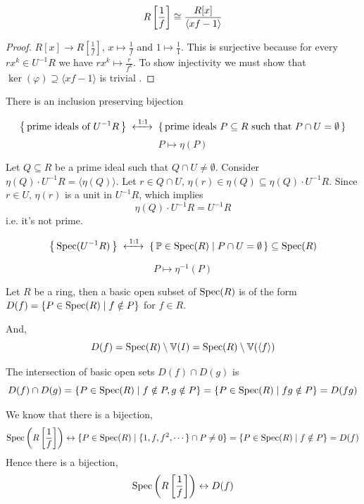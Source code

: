 \documentclass[12pt]{amsart}
\begin{document}
\begin{lemma}
    \[R\left[\frac{1}{f}\right] \cong \frac{R[x]}{\langle xf - 1 \rangle}\]
\end{lemma}
\begin{proof}
    $R[x] \to R\left[\frac{1}{f}\right]$, $x \mapsto \frac{1}{f}$ and $1 \mapsto \frac{1}{1}$. This is surjective because for every $rx^k \in U^{-1}R$ we have $rx^k \mapsto \frac{r}{f^k}$. To show injectivity we must show that $\ker(\varphi) \supseteq \langle xf -1 \rangle$ is trivial \todo{}. 
\end{proof}

\begin{theorem}
    There is an inclusion preserving bijection

    \[
        \left\{\, \text{prime ideals of } U^{-1}R \,\right\}
        \;\xleftrightarrow{\;1:1\;}\;
        \left\{\, \text{prime ideals } P \subseteq R \text{ such that } P \cap U = \emptyset \,\right\}
    \]
    \[P \mapsto \eta(P)\]

    Let $Q \subseteq R$ be a prime ideal such that $Q\cap U \neq \emptyset$. Consider $\eta(Q) \cdot U^{-1}R = \langle \eta(Q) \rangle$. Let $r \in Q \cap U$, $\eta(r) \in \eta(Q) \subseteq \eta(Q) \cdot U^{-1}R$. Since $r \in U$, $\eta(r)$ is a unit in $U^{-1}R$, which implies 
    \[\eta(Q)\cdot U^{-1}R = U^{-1}R\]
    i.e. it's not prime. \todo{}
\end{theorem}

\begin{theorem}
    \[
        \left\{\, \operatorname{Spec} (U^{-1}R) \,\right\}
        \;\xleftrightarrow{\;1:1\;}\;
        \left\{\, \mathbb P \in \operatorname{Spec}(R) \mid P \cap U = \emptyset \,\right\} \subseteq \operatorname{Spec}(R)
    \]

    \[P \mapsto \eta^{-1}(P)\]
\end{theorem}

\begin{definition}
    Let $R$ be a ring, then a basic open subset of $\operatorname{Spec}(R)$ is of the form $D(f) = \{P \in \operatorname{Spec}(R) \mid f \notin P\}$ for $f \in R$.  

    And, 
    \[D(f) = \operatorname{Spec}(R)\setminus\mathbb V(I) = \operatorname{Spec}(R) \setminus \mathbb V(\langle f \rangle)\]

    The intersection of basic open sets $D(f) \cap D(g)$ is 
    \[D(f) \cap D(g) = \{P \in \operatorname{Spec}(R) \mid f \notin P, g \notin P\} =\{P \in \operatorname{Spec}(R) \mid fg \notin P\} = D(fg)  \]
\end{definition}

\begin{remark}
    We know that there is a bijection, 
    \[\operatorname{Spec}\left(R\left[\frac{1}{f}\right]\right) \leftrightarrow \{P \in \operatorname{Spec}(R) \mid \{1, f, f^2, \cdots\} \cap P \neq 0 \} = \{P \in \operatorname{Spec}(R) \mid f \notin P\} = D(f)\]
    Hence there is a bijection, 
    \[\operatorname{Spec}\left(R\left[\frac{1}{f}\right]\right) \leftrightarrow  D(f)\]
\end{remark}
\end{document}
